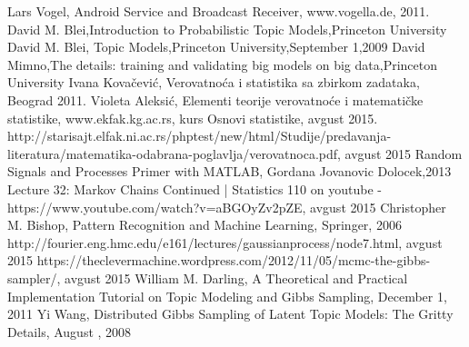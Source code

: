 %
%
\begin{thebibliography}{11}
 {Lars Vogel, Android Service and Broadcast Receiver, www.vogella.de, 2011.}
 { David M. Blei,Introduction to Probabilistic Topic Models,Princeton University}
 { David M. Blei, Topic Models,Princeton University,September 1,2009}
 { David Mimno,The details: training	and validating big	models on big data,Princeton University}
 {Ivana Kovačević, Verovatnoća i statistika sa zbirkom zadataka, Beograd 2011.}
 {Violeta Aleksić, Elementi teorije verovatnoće i matematičke statistike, }
 {www.ekfak.kg.ac.rs, kurs Osnovi statistike, avgust 2015.}
 {http://starisajt.elfak.ni.ac.rs/phptest/new/html/Studije/predavanja-literatura/matematika-odabrana-poglavlja/verovatnoca.pdf, avgust 2015}
 {Random Signals and Processes Primer with MATLAB, Gordana Jovanovic Dolocek,2013}
 {Lecture 32: Markov Chains Continued | Statistics 110  on youtube - https://www.youtube.com/watch?v=aBGOyZv2pZE, avgust 2015}
 {Christopher M. Bishop, Pattern Recognition and
Machine Learning, Springer, 2006}
 {http://fourier.eng.hmc.edu/e161/lectures/gaussianprocess/node7.html, avgust 2015}
 {https://theclevermachine.wordpress.com/2012/11/05/mcmc-the-gibbs-sampler/, avgust 2015}
 {William M. Darling, A Theoretical and Practical Implementation Tutorial on Topic Modeling and Gibbs Sampling, December 1, 2011}
 {Yi Wang, Distributed Gibbs Sampling of Latent Topic Models: The Gritty Details, August , 2008}
\end{thebibliography}
